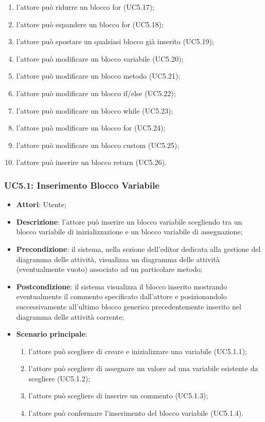 \begin{itemize}
\begin{enumerate}
		\item l'attore può ridurre un blocco for (UC5.17);
		\item l'attore può espandere un blocco for (UC5.18);
		\item l'attore può spostare un qualsiasi blocco già inserito (UC5.19);
		\item l'attore può modificare un blocco variabile (UC5.20);
		\item l'attore può modificare un blocco metodo (UC5.21);
		\item l'attore può modificare un blocco if/else (UC5.22);
		\item l'attore può modificare un blocco while (UC5.23);
		\item l'attore può modificare un blocco for (UC5.24);
		\item l'attore può modificare un blocco custom (UC5.25);
		\item l'attore può inserire un blocco return (UC5.26).
	\end{enumerate}
\end{itemize}

\subsubsection{UC5.1: Inserimento Blocco Variabile}
\label{UC5.1}
\begin{itemize}
	\item \textbf{Attori}: Utente;
	\item \textbf{Descrizione}: l'attore può inserire un blocco variabile scegliendo tra un blocco variabile di inizializzazione e un blocco variabile di assegnazione;
	\item \textbf{Precondizione}: il sistema, nella sezione dell'editor dedicata alla gestione del diagramma delle attività, visualizza un diagramma delle attività (eventualmente vuoto) associato ad un particolare metodo;
	\item \textbf{Postcondizione}: il sistema visualizza il blocco inserito mostrando eventualmente il commento specificato dall'attore e posizionandolo successivamente all'ultimo blocco generico precedentemente inserito nel diagramma delle attività corrente;
	\item \textbf{Scenario principale}:
	\begin{enumerate}
		\item l'attore può scegliere di creare e inizializzare una variabile (UC5.1.1);
		\item l'attore può scegliere di assegnare un valore ad una variabile esistente da scegliere (UC5.1.2);
		\item l'attore può scegliere di inserire un commento (UC5.1.3);
		\item l'attore può confermare l'inserimento del blocco variabile (UC5.1.4).
	\end{enumerate}
\end{itemize}

